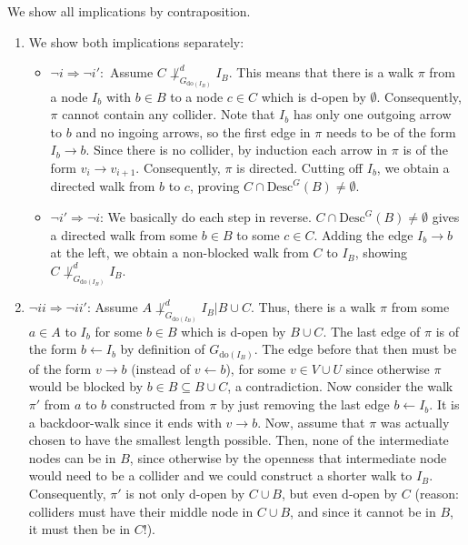     \begin{gradedsolution}
      We show all implications by contraposition.
      \begin{enumerate}
	\item We show both implications separately: 
	  \begin{itemize}
	\item $\neg i \Rightarrow \neg i':$ Assume $C \not\perp^d_{G_{\text{do}(I_B)}} I_B$. 
	  This means that there is a walk $\pi$ from a node $I_b$ with $b \in B$ to a node $c \in C$ which is d-open by $\emptyset$.
	  Consequently, $\pi$ cannot contain any collider. 
	  Note that $I_b$ has only one outgoing arrow to $b$ and no ingoing arrows, so the first edge in $\pi$ needs to be of the form $I_b \to b$.
	  Since there is no collider, by induction each arrow in $\pi$ is of the form $v_i \rightarrow v_{i+1}$.
	  Consequently, $\pi$ is directed. 
	  Cutting off $I_b$, we obtain a directed walk from $b$ to $c$, proving $C \cap \text{Desc}^G(B) \neq \emptyset$.
	\item $\neg i' \Rightarrow \neg i$: We basically do each step in reverse.
	  $C \cap \text{Desc}^G(B) \neq \emptyset$ gives a directed walk from some $b \in B$ to some $c \in C$.
	  Adding the edge $I_b \to b$ at the left, we obtain a non-blocked walk from $C$ to $I_B$, showing $C \not\perp^d_{G_{\text{do}(I_B)}} I_B$.
	\end{itemize}
	\item $\neg ii \Rightarrow \neg ii'$: Assume $A \not\perp^d_{G_{\text{do}(I_B)}} I_B | B \cup C$. 
	  Thus, there is a walk $\pi$ from some $a \in A$ to $I_b$ for some $b \in B$ which is d-open by $B \cup C$.
	  The last edge of $\pi$ is of the form $b \leftarrow I_b$ by definition of $G_{\text{do}(I_B)}$.
	  The edge before that then must be of the form $v \rightarrow b$ (instead of $v \leftarrow b$), for some $v \in V \cup U$ since otherwise $\pi$ would be blocked by $b \in B \subseteq B \cup C$, a contradiction.
	  Now consider the walk $\pi'$ from $a$ to $b$ constructed from $\pi$ by just removing the last edge $b \leftarrow I_b$.
	  It is a backdoor-walk since it ends with $v \rightarrow b$.
	  Now, assume that $\pi$ was actually chosen to have the smallest length possible. 
	  Then, none of the intermediate nodes can be in $B$, since otherwise by the openness that intermediate node would need to be a collider and we could construct a shorter walk to $I_B$.
	  Consequently, $\pi'$ is not only d-open by $C \cup B$, but even d-open by $C$ (reason: colliders must have their middle node in $C \cup B$, and since it cannot be in $B$, it must then be in $C$!).

\end{enumerate}
\end{gradedsolution}
